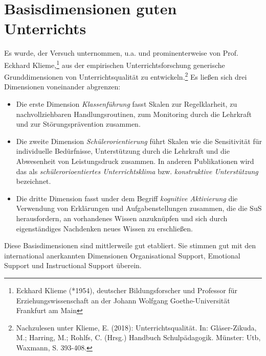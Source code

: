 \bip\bip
\section{Basisdimensionen guten Unterrichts}

Es wurde,  der Versuch unternommen, u.a. und prominenterweise von Prof. Eckhard Klieme,\footnote{Eckhard Klieme (*1954), deutscher Bildungsforscher und Professor f{\"u}r Erziehungswissenschaft an der Johann Wolfgang Goethe-Universit{\"a}t Frankfurt am Main} aus der empirischen Unterrichtsforschung generische Grunddimensionen von Unterrichtsqualit{\"a}t zu entwickeln.\footnote{Nachzulesen unter Klieme, E. (2018): Unterrichtsqualit{\"a}t. In: Gl{\"a}ser-Zikuda, M.; Harring, M.; Rohlfs, C. (Hrsg.) Handbuch Schulp{\"a}dagogik. M{\"u}nster: Utb, Waxmann, S. 393-408.} Es lie{\ss}en sich drei Dimensionen voneinander abgrenzen:

\begin{itemize}
\item
Die erste Dimension \emph{Klassenf{\"u}hrung} fasst Skalen zur Regelklarheit, zu nachvollziehbaren Handlungsroutinen, zum Monitoring durch die Lehrkraft und zur St{\"o}rungspr{\"a}vention zusammen.

\item
Die zweite Dimension \emph{Sch{\"u}lerorientierung} f{\"u}hrt Skalen wie die Sensitivit{\"a}t f{\"u}r individuelle Bed{\"u}rfnisse, Unterst{\"u}tzung durch die Lehrkraft und die Abwesenheit von Leistungsdruck zusammen. In anderen Publikationen wird das als \emph{sch{\"u}lerorioentiertes Unterrichtsklima} bzw. \emph{konstruktive Unterst{\"u}tzung} bezeichnet.

\item
Die dritte Dimension fasst under dem Begriff \emph{kognitive Aktivierung} die Verwendung von Erkl{\"a}rungen und Aufgabenstellungen zusammen, die die SuS herausfordern, an vorhandenes Wissen anzukn{\"u}pfen und sich durch eigenst{\"a}ndiges Nachdenken neues Wissen zu erschlie{\ss}en.
\end{itemize}

Diese Basisdimensionen sind mittlerweile gut etabliert. Sie stimmen gut mit den international anerkannten Dimensionen {\glqq}Organisational Support{\grqq}, {\glqq}Emotional Support{\grqq} und  {\glqq}Instructional Support{\grqq} {\"u}berein.

\bip\bip
